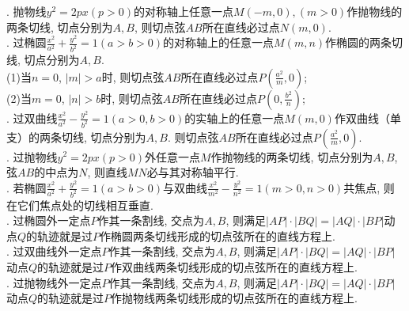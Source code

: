 \documentclass[10pt,column,letterpaper]{article}
\title{}
\author{}
\theoremstyle{mythmstyle}
\begin{document}
\large
{}. 抛物线$y^2 = 2px (p>0)$的对称轴上任意一点$M(-m,0),(m>0)$作抛物线的两条切线, 切点分别为$A,B$, 则切点弦$AB$所在直线必过点$N(m,0)$.\\

. 过椭圆$\frac{x^2}{a^2}+\frac{y^2}{b^2}=1(a>b>0)$的对称轴上的任意一点$M(m,n)$作椭圆的两条切线, 切点分别为$A,B$.\\
(1)当$n=0$, $\left|m\right|>a$时, 则切点弦$AB$所在直线必过点$P(\frac{a^2}{m},0)$;\\
(2)当$m=0$, $\left|n\right|>b$时, 则切点弦$AB$所在直线必过点$P(0,\frac{b^2}{n})$;\\

. 过双曲线$\frac{x^2}{a^2}-\frac{y^2}{b^2}=1(a>0,b>0)$的实轴上的任意一点$M(m,0)$作双曲线（单支）的两条切线, 切点分别为$A,B$. 则切点弦$AB$所在直线必过点$P(\frac{a^2}{m},0)$.\\

. 过抛物线$y^2 = 2px (p>0)$外任意一点$M$作抛物线的两条切线, 切点分别为$A,B$, 弦$AB$的中点为$N$, 则直线$MN$必与其对称轴平行.\\

. 若椭圆$\frac{x^2}{a^2}+\frac{y^2}{b^2}=1(a>b>0)$与双曲线$\frac{x^2}{m^2}-\frac{y^2}{n^2}=1(m>0,n>0)$共焦点, 则在它们焦点处的切线相互垂直.\\

. 过椭圆外一定点$P$作其一条割线, 交点为$A,B$, 则满足$\left|AP\right|\cdot\left|BQ\right|=\left|AQ\right|\cdot\left|BP\right|$动点$Q$的轨迹就是过$P$作椭圆两条切线形成的切点弦所在的直线方程上.\\

. 过双曲线外一定点$P$作其一条割线, 交点为$A,B$, 则满足$\left|AP\right|\cdot\left|BQ\right|=\left|AQ\right|\cdot\left|BP\right|$动点$Q$的轨迹就是过$P$作双曲线两条切线形成的切点弦所在的直线方程上.\\

. 过抛物线外一定点$P$作其一条割线, 交点为$A,B$, 则满足$\left|AP\right|\cdot\left|BQ\right|=\left|AQ\right|\cdot\left|BP\right|$动点$Q$的轨迹就是过$P$作抛物线两条切线形成的切点弦所在的直线方程上.\\
\end{document}
